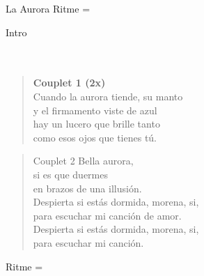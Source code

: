 \begin{song}[vals]{La Aurora}
Ritme = \\
\begin{instrumental}{Intro}
 \measure{}   \measure*{}\\
\measure{} \measure{} \measure*{} \measure{}  \\
 \measure{} \measure{}  \measure*{}\\
 \measure{}  \measure{}  
\end{instrumental}
\begin{verse}{}
\hspace{-2em}\textbf{Couplet 1 (2x)}\\
Cuando la aurora tiende, su manto\\
y el firmamento viste de azul\hspace{3em}
\\ hay un lucero que brille tanto\\
como esos ojos que tienes tú.\hspace{3em}\\
\end{verse}
\begin{verse}{Couplet 2}
Bella aurora,\\
si es que duermes\\
en brazos de una illusión.\hspace{1em}\\
Despierta si estás dormida, morena, si,\\
para escuchar mi canción de amor.\\
Despierta si estás dormida, morena, si,\\
para escuchar mi canción.\hspace{1em}\hspace{2em}\\
\end{verse}
Ritme = \\

\end{song}
